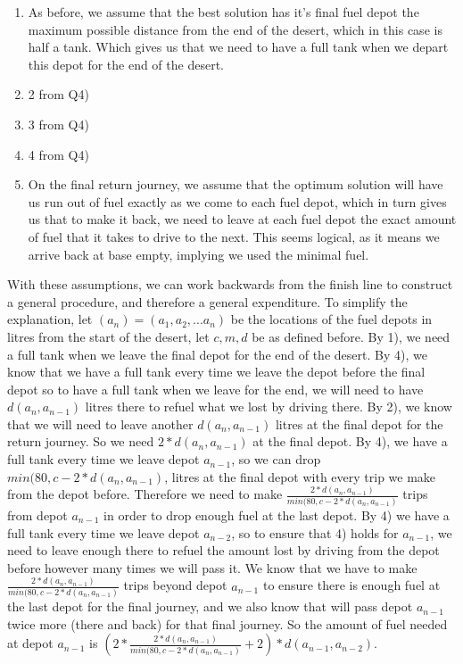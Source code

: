 \documentclass{homework}
\begin{document}
\begin{enumerate}
    \item As before, we assume that the best solution has it's final fuel depot the maximum possible distance from the end of the desert, which in this case is half a tank. Which gives us that we need to have a full tank when we depart this depot for the end of the desert.
    \item 2 from Q4)
    \item 3 from Q4)
    \item 4 from Q4)
    \item On the final return journey, we assume that the optimum solution will have us run out of fuel exactly as we come to each fuel depot, which in turn gives us that to make it back, we need to leave at each fuel depot the exact amount of fuel that it takes to drive to the next. This seems logical, as it means we arrive back at base empty, implying we used the minimal fuel.

\end{enumerate}
With these assumptions, we can work backwards from the finish line to construct a general procedure, and therefore a general expenditure. To simplify the explanation, let $(a_n) = (a_1, a_2, ... a_n)$ be the locations of the fuel depots in litres from the start of the desert, let $c, m, d$ be as defined before.
\newline\newline
By 1), we need a full tank when we leave the final depot for the end of the desert. By 4), we know that we have a full tank every time we leave the depot before the final depot so to have a full tank when we leave for the end, we will need to have $d(a_n, a_{n-1})$ litres there to refuel what we lost by driving there. By 2), we know that we will need to leave another $d(a_n, a_{n-1})$ litres at the final depot for the return journey. So we need $2*d(a_n, a_{n-1})$ at the final depot.
\newline\newline
By 4), we have a full tank every time we leave depot $a_{n-1}$, so we can drop $min(80, c - 2*d(a_n, a_{n-1})$, litres at the final depot with every trip we make from the depot before. Therefore we need to make $\frac{2*d(a_n, a_{n-1})}{min(80, c - 2*d(a_n, a_{n-1})}$ trips from depot $a_{n-1}$ in order to drop enough fuel at the last depot.
\newline\newline
By 4) we have a full tank every time we leave depot $a_{n-2}$, so to ensure that 4) holds for $a_{n-1}$, we need to leave enough there to refuel the amount lost by driving from the depot before however many times we will pass it. We know that we have to make $\frac{2*d(a_n, a_{n-1})}{min(80, c - 2*d(a_n, a_{n-1})}$ trips beyond depot $a_{n-1}$ to ensure there is enough fuel at the last depot for the final journey, and we also know that will pass depot $a_{n-1}$ twice more (there and back) for that final journey. So the amount of fuel needed at depot $a_{n-1}$ is $(2*\frac{2*d(a_n, a_{n-1})}{min(80, c - 2*d(a_n, a_{n-1})} + 2)*d(a_{n-1},a_{n-2})$.
\end{document}

